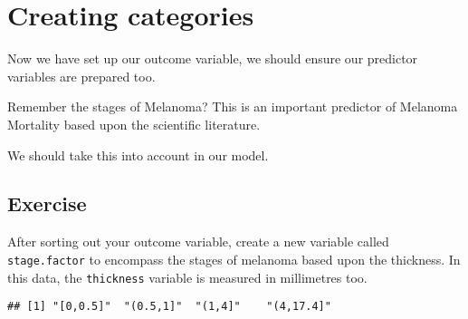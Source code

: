 \documentclass[]{book}
\makeatletter
\newenvironment{Shaded}{\begin{snugshade}}{\end{snugshade}}
\newcommand{\KeywordTok}[1]{\textcolor[rgb]{0.13,0.29,0.53}{\textbf{#1}}}
\newcommand{\DataTypeTok}[1]{\textcolor[rgb]{0.13,0.29,0.53}{#1}}
\newcommand{\DecValTok}[1]{\textcolor[rgb]{0.00,0.00,0.81}{#1}}
\newcommand{\FloatTok}[1]{\textcolor[rgb]{0.00,0.00,0.81}{#1}}
\newcommand{\StringTok}[1]{\textcolor[rgb]{0.31,0.60,0.02}{#1}}
\newcommand{\CommentTok}[1]{\textcolor[rgb]{0.56,0.35,0.01}{\textit{#1}}}
\newcommand{\OperatorTok}[1]{\textcolor[rgb]{0.81,0.36,0.00}{\textbf{#1}}}
\newcommand{\NormalTok}[1]{#1}
\newenvironment{kframe}{%
\medskip{}
\setlength{\fboxsep}{.8em}
 \def\at@end@of@kframe{}%
 \ifinner\ifhmode%
  \def\at@end@of@kframe{\end{minipage}}%
  \begin{minipage}{\columnwidth}%
 \fi\fi%
 \def\FrameCommand##1{\hskip\@totalleftmargin \hskip-\fboxsep
 \colorbox{shadecolor}{##1}\hskip-\fboxsep
     \hskip-\linewidth \hskip-\@totalleftmargin \hskip\columnwidth}%
 \MakeFramed {\advance\hsize-\width
   \@totalleftmargin\z@ \linewidth\hsize
   \@setminipage}}%
 {\par\unskip\endMakeFramed%
 \at@end@of@kframe}
\renewenvironment{Shaded}{\begin{kframe}}{\end{kframe}}
\theoremstyle{definition}
\theoremstyle{definition}
\theoremstyle{definition}
\theoremstyle{remark}
\makeatother
\begin{document}
\section{Creating categories}\label{creating-categories}

Now we have set up our outcome variable, we should ensure our predictor
variables are prepared too.

Remember the stages of Melanoma? This is an important predictor of
Melanoma Mortality based upon the scientific literature.

We should take this into account in our model.

\subsection{Exercise}\label{exercise-43}

After sorting out your outcome variable, create a new variable called
\texttt{stage.factor} to encompass the stages of melanoma based upon the
thickness. In this data, the \texttt{thickness} variable is measured in
millimetres too.

\begin{Shaded}
\end{Shaded}

\begin{verbatim}
## [1] "[0,0.5]"  "(0.5,1]"  "(1,4]"    "(4,17.4]"
\end{verbatim}

\begin{Shaded}
\begin{Highlighting}[]
\NormalTok{mydata}\OperatorTok{$}\NormalTok{stage.factor }\OperatorTok{%>%}\StringTok{ }
\StringTok{  }\KeywordTok{fct_recode}\NormalTok{(}\StringTok{"Stage I"}\NormalTok{   =}\StringTok{ "[0,0.5]"}\NormalTok{,}
             \StringTok{"Stage II"}\NormalTok{  =}\StringTok{ "(0.5,1]"}\NormalTok{,}
             \StringTok{"Stage III"}\NormalTok{ =}\StringTok{ "(1,4]"}\NormalTok{,}
             \StringTok{"Stage IV"}\NormalTok{  =}\StringTok{ "(4,17.4]"}
\NormalTok{    ) ->}\StringTok{ }\NormalTok{mydata}\OperatorTok{$}\NormalTok{stage.factor}

\NormalTok{mydata}\OperatorTok{$}\NormalTok{stage.factor }\OperatorTok{%>%}\StringTok{ }\KeywordTok{levels}\NormalTok{()}
\end{Highlighting}
\end{Shaded}
\end{document}
